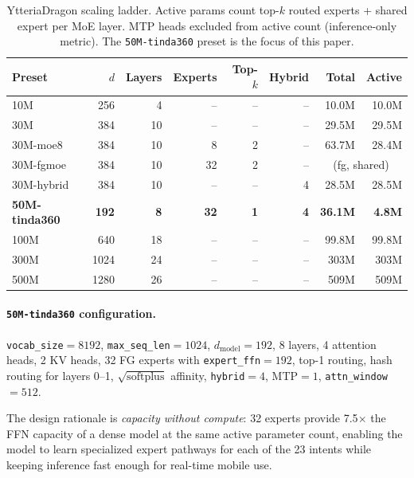 \documentclass[11pt,a4paper]{article}
\begin{document}
\begin{table}[h]
\centering
\caption{YtteriaDragon scaling ladder. Active params count top-$k$ routed
experts + shared expert per MoE layer. MTP heads excluded from active count
(inference-only metric). The \texttt{50M-tinda360} preset is the focus of
this paper.}
\label{tab:presets}
\small
\begin{tabular}{lrrrrrrr}
\toprule
\textbf{Preset} & \textbf{$d$} & \textbf{Layers} & \textbf{Experts} &
  \textbf{Top-$k$} & \textbf{Hybrid} & \textbf{Total} & \textbf{Active} \\
\midrule
10M         & 256  & 4  & --  & -- & -- & 10.0M & 10.0M \\
30M         & 384  & 10 & --  & -- & -- & 29.5M & 29.5M \\
30M-moe8    & 384  & 10 & 8   & 2  & -- & 63.7M & 28.4M \\
30M-fgmoe   & 384  & 10 & 32  & 2  & -- & \multicolumn{2}{c}{(fg, shared)} \\
30M-hybrid  & 384  & 10 & --  & -- & 4  & 28.5M & 28.5M \\
\textbf{50M-tinda360} & \textbf{192} & \textbf{8} & \textbf{32} &
  \textbf{1} & \textbf{4} & \textbf{36.1M} & \textbf{4.8M} \\
100M        & 640  & 18 & --  & -- & -- & 99.8M & 99.8M \\
300M        & 1024 & 24 & --  & -- & -- & 303M  & 303M \\
500M        & 1280 & 26 & --  & -- & -- & 509M  & 509M \\
\bottomrule
\end{tabular}
\end{table}

\paragraph{\texttt{50M-tinda360} configuration.}
\texttt{vocab\_size}$=8192$, \texttt{max\_seq\_len}$=1024$, $d_{\text{model}}=192$,
8 layers, 4 attention heads, 2 KV heads, 32 FG experts with
\texttt{expert\_ffn}$=192$, top-1 routing, hash routing for layers 0--1,
$\sqrt{\mathrm{softplus}}$ affinity, \texttt{hybrid}$=4$, MTP$=1$,
\texttt{attn\_window}$=512$.

The design rationale is \emph{capacity without compute}: 32 experts provide
7.5$\times$ the FFN capacity of a dense model at the same active parameter
count, enabling the model to learn specialized expert pathways for each of
the 23 intents while keeping inference fast enough for real-time mobile use.
\end{document}
